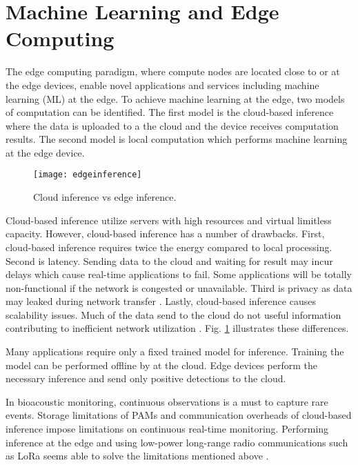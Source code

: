 


\FloatBarrier

\section{Machine Learning and Edge Computing}

The edge computing paradigm, where compute nodes are located close to or at the edge devices, enable novel applications and services including machine learning (ML) at the edge.
To achieve machine learning at the edge, two models of computation can be identified.
The first model is the cloud-based inference where the data is uploaded to a the cloud and the device receives computation results. The second model is local computation which performs machine learning at the edge device.


\begin{figure}[b]
\centering
	\texttt{[image: edgeinference]}
	\caption{Cloud inference vs edge inference.}
	\label{edgeinference}
\end{figure}

Cloud-based inference utilize servers with high resources and virtual limitless capacity. 
However, cloud-based inference has a number of drawbacks. First, cloud-based inference requires twice the energy compared to local processing. Second is latency. Sending data to the cloud and waiting for result may incur delays which cause real-time applications to fail. Some applications will be totally non-functional if the network is congested or unavailable. Third is privacy as data may leaked during network transfer \citep{Lane2016}. Lastly, cloud-based inference causes scalability issues. Much of the data send to the cloud do not useful information contributing to inefficient network utilization  \cite{Chen2019}.
Fig. \ref{edgeinference} illustrates these differences.

Many applications require only a fixed trained model for inference.
Training the model can be performed offline by at the cloud.
Edge devices perform the necessary inference and send only positive detections to the cloud.

In bioacoustic monitoring, continuous observations is a must to capture rare events.
Storage limitations of PAMs and communication overheads of cloud-based inference impose limitations on continuous real-time monitoring.
Performing inference at the edge and using low-power long-range radio communications such as LoRa seems able to solve the limitations mentioned above \cite{Ayele2018}.

